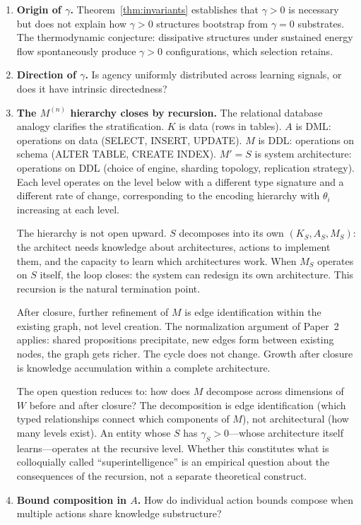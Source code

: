 \documentclass[11pt]{article}
\theoremstyle{definition}
\theoremstyle{remark}
\begin{document}
\begin{enumerate}
\item \textbf{Origin of $\gamma$.} Theorem~\ref{thm:invariants}
      establishes that $\gamma > 0$ is necessary but does not explain
      how $\gamma > 0$ structures bootstrap from $\gamma = 0$
      substrates. The thermodynamic conjecture: dissipative structures
      \cite{Prigogine1984, England2013} under sustained energy flow
      spontaneously produce $\gamma > 0$ configurations, which selection
      retains.

\item \textbf{Direction of $\gamma$.} Is agency uniformly distributed
      across learning signals, or does it have intrinsic directedness?

\item \textbf{The $M^{(n)}$ hierarchy closes by recursion.}
      The relational database analogy clarifies the stratification.
      $K$ is data (rows in tables). $A$ is DML: operations on data
      (SELECT, INSERT, UPDATE). $M$ is DDL: operations on schema
      (ALTER TABLE, CREATE INDEX). $M' = S$ is system architecture:
      operations on DDL (choice of engine, sharding topology,
      replication strategy). Each level operates on the level below
      with a different type signature and a different rate of change,
      corresponding to the encoding hierarchy with $\theta_i$
      increasing at each level.

      The hierarchy is not open upward. $S$ decomposes into its own
      $(K_S, A_S, M_S)$: the architect needs knowledge about
      architectures, actions to implement them, and the capacity to
      learn which architectures work. When $M_S$ operates on $S$
      itself, the loop closes: the system can redesign its own
      architecture. This recursion is the natural termination point.

      After closure, further refinement of $M$ is edge identification
      within the existing graph, not level creation. The normalization
      argument of Paper~2 \cite{McCarthy2026b} applies: shared
      propositions precipitate, new edges form between existing nodes,
      the graph gets richer. The cycle does not change. Growth after
      closure is knowledge accumulation within a complete architecture.

      The open question reduces to: how does $M$ decompose across
      dimensions of $W$ before and after closure? The decomposition is
      edge identification (which typed relationships connect which
      components of $M$), not architectural (how many levels exist).
      An entity whose $S$ has $\gamma_S > 0$---whose architecture
      itself learns---operates at the recursive level. Whether this
      constitutes what is colloquially called ``superintelligence''
      is an empirical question about the consequences of the recursion,
      not a separate theoretical construct.

\item \textbf{Bound composition in $A$.} How do individual action
      bounds compose when multiple actions share knowledge substructure?
\end{enumerate}
\end{document}
